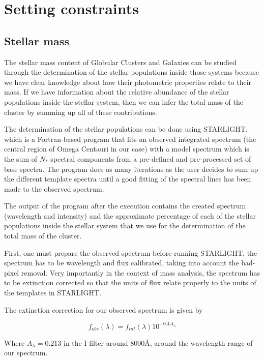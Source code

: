 \section{Setting constraints}

\subsection{Stellar mass}

The stellar mass content of Globular Clusters and Galaxies can be studied through the determination of the stellar populations inside those systems because we have clear knowledge about how their photometric properties relate to their mass. If we have information about the relative abundance of the stellar populations inside the stellar system, then we can infer the total mass of the cluster by summing up all of these contributions. 

The determination of the stellar populations can be done using STARLIGHT, which is a Fortran-based program that fits an observed integrated spectrum (the central region of Omega Centauri in our case) with a model spectrum which is the sum of $N_{*}$ spectral components from a pre-defined and pre-processed set of base spectra. The program does as many iterations as the user decides to sum up the different template spectra until a good fitting of the spectral lines has been made to the observed spectrum. 

The output of the program after the execution contains the created spectrum (wavelength and intensity) and the approximate percentage of each of the stellar populations inside the stellar system that we use for the determination of the total mass of the cluster.

First, one must prepare the observed spectrum before running STARLIGHT, the spectrum has to be wavelength and flux calibrated, taking into account the bad-pixel removal. Very importantly in the context of mass analysis, the spectrum has to be extinction corrected so that the units of flux relate properly to the units of the templates in STARLIGHT.     

The extinction correction for our observed spectrum is given by

\begin{equation}
f_{obs}(\lambda)=f_{int}(\lambda)10^{-0.4A_{\lambda}}
\end{equation}

Where $A_{\lambda}=0.213$ in the I filter around $8000 \textrm{\AA}$, around the wavelength range of our spectrum. 

